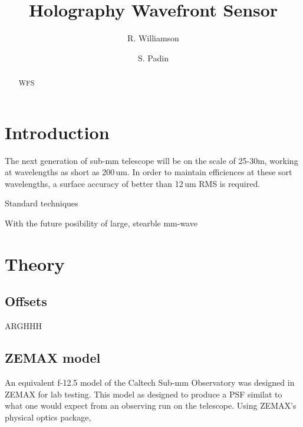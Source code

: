 \documentclass[osajnl,twocolumn,showpacs,superscriptaddress,11pt]{revtex4-1} %
\begin{document}
\title{Holography Wavefront Sensor}

\author{R. Williamson}
\author{S. Padin}


\begin{abstract} WFS
\end{abstract}


\maketitle %

\section{Introduction}

The next generation of sub-mm telescope will be on the scale of 25-30m, working at wavelengths as short as 200\,um.  In order to maintain efficiences at these sort wavelengths, a surface accuracy of better than 12\,um RMS is required. 

Standard techniques  

With the future posibility of large, stearble mm-wave 

\section{Theory}



\subsection{Offsets}

ARGHHH

\subsection{ZEMAX model}

An equivalent f-12.5 model of the Caltech Sub-mm Observatory was designed in ZEMAX for lab testing.  This model as designed to produce a PSF similat to what one would expect from an observing run on the telescope.  Using ZEMAX's physical optics package, 
\end{document}
